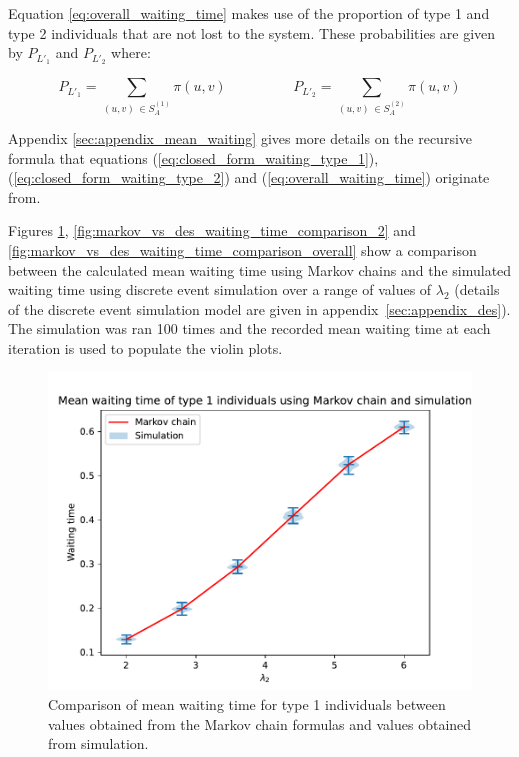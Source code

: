 Equation \ref{eq:overall_waiting_time} makes use of the proportion of type 1 
and type 2 individuals that are not lost to the system. These probabilities are 
given by \(P_{L'_1}\) and \(P_{L'_2}\) where:

\begin{equation}\label{eq:proportion_of_accepting_individuals}
    P_{L'_1} = \sum_{(u,v) \, \in S_A^{(1)}} \pi(u,v) \hspace{2cm}
    P_{L'_2} = \sum_{(u,v) \, \in S_A^{(2)}} \pi(u,v)
\end{equation}
 
Appendix \ref{sec:appendix_mean_waiting} gives more details on the recursive
formula that equations (\ref{eq:closed_form_waiting_type_1}),
(\ref{eq:closed_form_waiting_type_2}) and (\ref{eq:overall_waiting_time})
originate from. 

Figures \ref{fig:markov_vs_des_waiting_time_comparison_1},
\ref{fig:markov_vs_des_waiting_time_comparison_2} and
\ref{fig:markov_vs_des_waiting_time_comparison_overall} show a comparison 
between the calculated mean waiting time using Markov chains and the simulated 
waiting time using discrete event simulation over a range of values of 
\(\lambda_2\) (details of the discrete event simulation model are given in 
appendix~\ref{sec:appendix_des}).
The simulation was ran 100 times and the recorded mean waiting time at each 
iteration is used to populate the violin plots.

\begin{figure}[H]
    \centering
    \includegraphics[width=.8\textwidth]{imgs/waiting_time_comparison/waiting_1.pdf}
    \caption{
        Comparison of mean waiting time for type 1 individuals between values 
        obtained from the Markov chain formulas and values obtained from 
        simulation.
    }
    \label{fig:markov_vs_des_waiting_time_comparison_1}
\end{figure}

